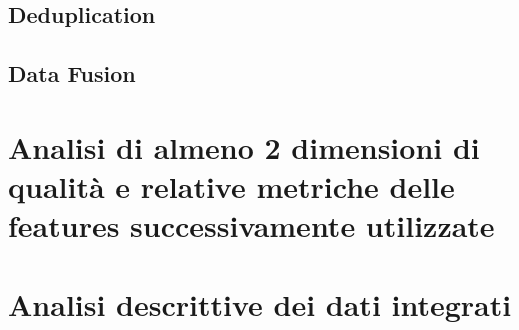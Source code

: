 \section{Deduplication}

\section{Data Fusion}

\chapter{Analisi di almeno 2 dimensioni di qualità e relative metriche delle features successivamente utilizzate}
\chapter{Analisi descrittive dei dati integrati}
